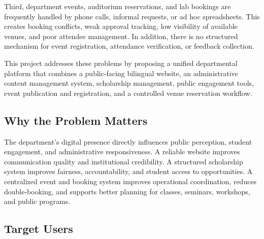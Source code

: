 \documentclass[12pt,a4paper]{article}
\begin{document}
Third, department events, auditorium reservations, and lab bookings are frequently handled by phone calls, informal requests, or ad hoc spreadsheets. This creates booking conflicts, weak approval tracking, low visibility of available venues, and poor attendee management. In addition, there is no structured mechanism for event registration, attendance verification, or feedback collection.

This project addresses these problems by proposing a unified departmental platform that combines a public-facing bilingual website, an administrative content management system, scholarship management, public engagement tools, event publication and registration, and a controlled venue reservation workflow.

\subsection{Why the Problem Matters}

The department's digital presence directly influences public perception, student engagement, and administrative responsiveness. A reliable website improves communication quality and institutional credibility. A structured scholarship system improves fairness, accountability, and student access to opportunities. A centralized event and booking system improves operational coordination, reduces double-booking, and supports better planning for classes, seminars, workshops, and public programs.

\subsection{Target Users}
\end{document}
